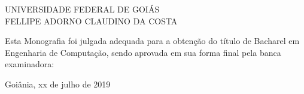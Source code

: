 
%
% 
%
\begin{folhadeaprovacao}


\begin{center}


            {UNIVERSIDADE FEDERAL DE GOIÁS} \\
           

    \vspace{1.5cm}
                                    {FELLIPE ADORNO CLAUDINO DA COSTA}\\
    \bfseries{}
\end{center}

Esta Monografia foi julgada adequada para a obten\c{c}\~{a}o do título  de Bacharel em Engenharia de Computação, sendo aprovada em sua forma final  pela banca examinadora:

    \vspace{2.5cm}
    \vspace{3 cm}%

    \begin{center}
        Goiânia, xx de julho de 2019
    \end{center}
  
\end{folhadeaprovacao}
